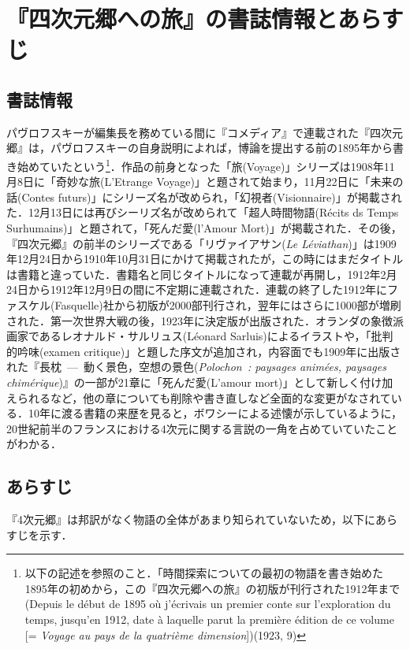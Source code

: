 \section{『四次元郷への旅』の書誌情報とあらすじ}
\subsection{書誌情報}
パヴロフスキーが編集長を務めている間に『コメディア』で連載された『四次元郷』は，パヴロフスキーの自身説明によれば，博論を提出する前の1895年から書き始めていたという\footnote{以下の記述を参照のこと．「時間探索についての最初の物語を書き始めた1895年の初めから，この『四次元郷への旅』の初版が刊行された1912年まで(Depuis le début de 1895 où j'écrivais un premier conte sur l'exploration du temps, jusqu'en 1912, date à laquelle parut la première édition de ce volume [= \emph{Voyage au pays de la quatrième dimension}])(1923, 9)}．作品の前身となった「旅(Voyage)」シリーズは1908年11月8日に「奇妙な旅(L'Etrange Voyage)」と題されて始まり，11月22日に「未来の話(Contes futurs)」にシリーズ名が改められ，「幻視者(Visionnaire)」が掲載された．12月13日には再びシーリズ名が改められて「超人時間物語(Récits ds Temps Surhumains)」と題されて，「死んだ愛(l'Amour Mort)」が掲載された．その後，『四次元郷』の前半のシリーズである「リヴァイアサン(\emph{Le Léviathan})」は1909年12月24日から1910年10月31日にかけて掲載されたが，この時にはまだタイトルは書籍と違っていた．書籍名と同じタイトルになって連載が再開し，1912年2月24日から1912年12月9日の間に不定期に連載された．連載の終了した1912年にファスケル(Fasquelle)社から初版が2000部刊行され，翌年にはさらに1000部が増刷された．第一次世界大戦の後，1923年に決定版が出版された．オランダの象徴派画家であるレオナルド・サルリュス(Léonard Sarluis)によるイラストや，「批判的吟味(examen critique)」と題した序文が追加され，内容面でも1909年に出版された『長枕~---~動く景色，空想の景色(\emph{Polochon~: paysages animées, paysages chimérique})』の一部が21章に「死んだ愛(L'amour mort)」として新しく付け加えられるなど，他の章についても削除や書き直しなど全面的な変更がなされている．10年に渡る書籍の来歴を見ると，ボワシーによる述懐が示しているように，20世紀前半のフランスにおける4次元に関する言説の一角を占めていていたことがわかる．

\subsection{あらすじ}
『4次元郷』は邦訳がなく物語の全体があまり知られていないため，以下にあらすじを示す．

